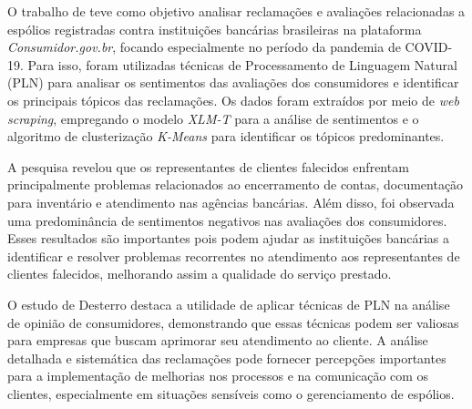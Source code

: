 O trabalho de  teve como objetivo analisar reclamações e avaliações relacionadas a espólios registradas contra instituições bancárias brasileiras na plataforma \textit{Consumidor.gov.br}, focando especialmente no período da pandemia de COVID-19. Para isso, foram utilizadas técnicas de Processamento de Linguagem Natural (PLN) para analisar os sentimentos das avaliações dos consumidores e identificar os principais tópicos das reclamações. Os dados foram extraídos por meio de \textit{web scraping}, empregando o modelo \textit{XLM-T} para a análise de sentimentos e o algoritmo de clusterização \textit{K-Means} para identificar os tópicos predominantes.

A pesquisa revelou que os representantes de clientes falecidos enfrentam principalmente problemas relacionados ao encerramento de contas, documentação para inventário e atendimento nas agências bancárias. Além disso, foi observada uma predominância de sentimentos negativos nas avaliações dos consumidores. Esses resultados são importantes pois podem ajudar as instituições bancárias a identificar e resolver problemas recorrentes no atendimento aos representantes de clientes falecidos, melhorando assim a qualidade do serviço prestado.

O estudo de Desterro destaca a utilidade de aplicar técnicas de PLN na análise de opinião de consumidores, demonstrando que essas técnicas podem ser valiosas para empresas que buscam aprimorar seu atendimento ao cliente. A análise detalhada e sistemática das reclamações pode fornecer  percepções importantes para a implementação de melhorias nos processos e na comunicação com os clientes, especialmente em situações sensíveis como o gerenciamento de espólios.
